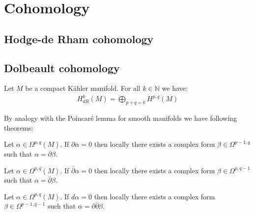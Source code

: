 \section{Cohomology}
\subsection{Hodge-de Rham cohomology}


\subsection{Dolbeault cohomology}
	
	\begin{theorem}
		Let $M$ be a compact K\"ahler manifold. For all $k\in\mathbb{N}$ we have:
		\begin{gather}
			H^k_{dR}(M) = \bigoplus_{p+q=k}H^{p, q}(M)
		\end{gather}
	\end{theorem}
	
	By analogy with the Poincar\'e lemma for smooth manifolds we have following theorems:
	\begin{theorem}
		Let $\alpha\in\Omega^{p, q}(M)$. If $\partial\alpha = 0$ then locally there exists a complex form $\beta\in\Omega^{p-1, q}$ such that $\alpha = \partial\beta$.
	\end{theorem}
	\begin{theorem}
		Let $\alpha\in\Omega^{p, q}(M)$. If $\overline{\partial}\alpha = 0$ then locally there exists a complex form $\beta\in\Omega^{p, q-1}$ such that $\alpha = \overline{\partial}\beta$.
	\end{theorem}
	\begin{theorem}\label{complex:del_delbar_lemma}
		Let $\alpha\in\Omega^{p, q}(M)$. If $d\alpha = 0$ then locally there exists a complex form $\beta\in\Omega^{p-1, q-1}$ such that $\alpha = \partial\overline{\partial}\beta$.
	\end{theorem}
